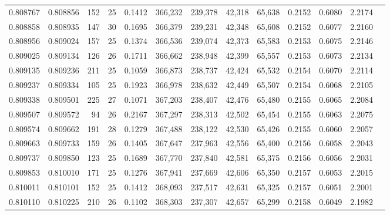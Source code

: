 \begin{tabular}{rrrrrrrrrrrrr}
0.808767 & 0.808856 &   152 &  25 &                                     0.1412 & 366,232 & 239,378 &  42,318 &  65,638 & 0.2152 & 0.6080 & 2.2174 \\
0.808858 & 0.808935 &   147 &  30 &                                     0.1695 & 366,379 & 239,231 &  42,348 &  65,608 & 0.2152 & 0.6077 & 2.2160 \\
0.808956 & 0.809024 &   157 &  25 &                                     0.1374 & 366,536 & 239,074 &  42,373 &  65,583 & 0.2153 & 0.6075 & 2.2146 \\
0.809025 & 0.809134 &   126 &  26 &                                     0.1711 & 366,662 & 238,948 &  42,399 &  65,557 & 0.2153 & 0.6073 & 2.2134 \\
0.809135 & 0.809236 &   211 &  25 &                                     0.1059 & 366,873 & 238,737 &  42,424 &  65,532 & 0.2154 & 0.6070 & 2.2114 \\
0.809237 & 0.809334 &   105 &  25 &                                     0.1923 & 366,978 & 238,632 &  42,449 &  65,507 & 0.2154 & 0.6068 & 2.2105 \\
0.809338 & 0.809501 &   225 &  27 &                                     0.1071 & 367,203 & 238,407 &  42,476 &  65,480 & 0.2155 & 0.6065 & 2.2084 \\
0.809507 & 0.809572 &    94 &  26 &                                     0.2167 & 367,297 & 238,313 &  42,502 &  65,454 & 0.2155 & 0.6063 & 2.2075 \\
0.809574 & 0.809662 &   191 &  28 &                                     0.1279 & 367,488 & 238,122 &  42,530 &  65,426 & 0.2155 & 0.6060 & 2.2057 \\
0.809663 & 0.809733 &   159 &  26 &                                     0.1405 & 367,647 & 237,963 &  42,556 &  65,400 & 0.2156 & 0.6058 & 2.2043 \\
0.809737 & 0.809850 &   123 &  25 &                                     0.1689 & 367,770 & 237,840 &  42,581 &  65,375 & 0.2156 & 0.6056 & 2.2031 \\
0.809853 & 0.810010 &   171 &  25 &                                     0.1276 & 367,941 & 237,669 &  42,606 &  65,350 & 0.2157 & 0.6053 & 2.2015 \\
0.810011 & 0.810101 &   152 &  25 &                                     0.1412 & 368,093 & 237,517 &  42,631 &  65,325 & 0.2157 & 0.6051 & 2.2001 \\
0.810110 & 0.810225 &   210 &  26 &                                     0.1102 & 368,303 & 237,307 &  42,657 &  65,299 & 0.2158 & 0.6049 & 2.1982 \\

\end{tabular}
